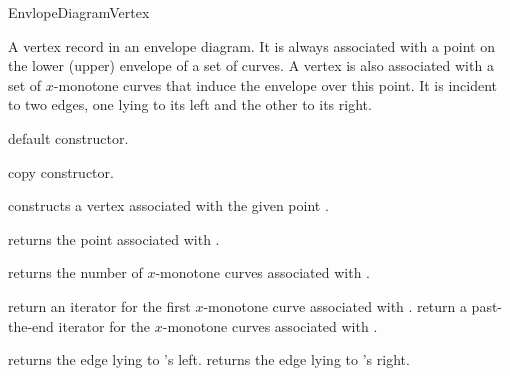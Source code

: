 
\ccRefPageBegin

\begin{ccRefConcept}{EnvlopeDiagramVertex}

\ccDefinition

A vertex record in an envelope diagram. It is always associated with a point
on the lower (upper) envelope of a set of curves. A vertex is also
associated with a set of $x$-monotone curves that induce the envelope
over this point. It is incident to two edges, one lying to its
left and the other to its right.

\ccTypes


\ccGlue
{} 

\ccCreation
{}

    {default constructor.}
    
    {copy constructor.}

    {constructs a vertex associated with the given point .}
        
\ccAccessFunctions

    {returns the point associated with \ccVar.}

    {returns the number of $x$-monotone curves associated with \ccVar.}

    {return an iterator for the first $x$-monotone curve associated with \ccVar.}
\ccGlue
{}
    {return a past-the-end iterator for the $x$-monotone curves associated with \ccVar.}

    {returns the edge lying to \ccVar's left.}
\ccGlue
{}
    {returns the edge lying to \ccVar's right.}


\end{ccRefConcept}
